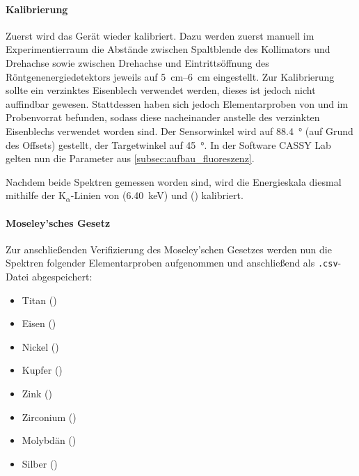 \documentclass[ngerman]{scrartcl}
\begin{document}
\paragraph{Kalibrierung}
Zuerst wird das Gerät wieder kalibriert. Dazu werden zuerst manuell im Experimentierraum die Abstände zwischen Spaltblende des Kollimators und Drehachse sowie zwischen Drehachse und Eintrittsöffnung des Röntgenenergiedetektors jeweils auf \SIrange{5}{6}{cm} eingestellt. Zur Kalibrierung sollte ein verzinktes Eisenblech verwendet werden, dieses ist jedoch nicht auffindbar gewesen. Stattdessen haben sich jedoch Elementarproben von  und  im Probenvorrat befunden, sodass diese nacheinander anstelle des verzinkten Eisenblechs verwendet worden sind. Der Sensorwinkel wird auf \SI{88.4}{\degree} (auf Grund des Offsets) gestellt, der Targetwinkel auf \SI{45}{\degree}. In der Software CASSY Lab gelten nun die Parameter aus \autoref{subsec:aufbau_fluoreszenz}.

Nachdem beide Spektren gemessen worden sind, wird die Energieskala diesmal mithilfe der K$_\alpha$-Linien von  (\SI{6,40}{keV}) und  () kalibriert.

\paragraph{Moseley'sches Gesetz}
Zur anschließenden Verifizierung des Moseley'schen Gesetzes werden nun die Spektren folgender Elementarproben aufgenommen und anschließend als \texttt{.csv}-Datei abgespeichert:
\begin{itemize}
    \item Titan ()
    \item Eisen ()
    \item Nickel ()
    \item Kupfer ()
    \item Zink ()
    \item Zirconium ()
    \item Molybdän ()
    \item Silber ()
\end{itemize}
\end{document}
